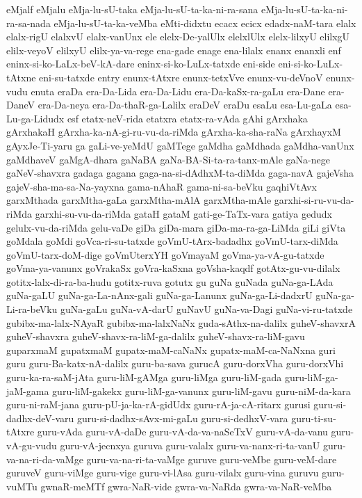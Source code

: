 {eMjalf
eMjalu
eMja-lu-sU-taka
eMja-lu-sU-ta-ka-ni-ra-sana
eMja-lu-sU-ta-ka-ni-ra-sa-nada
eMja-lu-sU-ta-ka-veMba
eMti-didxtu
ecacx
ecicx
edadx-naM-tara
elalx
elalx-rigU
elalxvU
elalx-vanUnx
ele
elelx-De-yalUlx
elelxlUlx
elelx-lilxyU
elilxgU
elilx-veyoV
elilxyU
elilx-ya-va-rege
ena-gade
enage
ena-lilalx
enanx
enanxli
enf
eninx-si-ko-LaLx-beV-kA-dare
eninx-si-ko-LuLx-tatxde
eni-side
eni-si-ko-LuLx-tAtxne
eni-su-tatxde
entry
enunx-tAtxre
enunx-tetxVve
enunx-vu-deVnoV
enunx-vudu
enuta
eraDa
era-Da-Lida
era-Da-Lidu
era-Da-kaSx-ra-gaLu
era-Dane
era-DaneV
era-Da-neya
era-Da-thaR-ga-Lalilx
eraDeV
eraDu
esaLu
esa-Lu-gaLa
esa-Lu-ga-Lidudx
esf
etatx-neV-rida
etatxra
etatx-ra-vAda
gAhi
gArxhaka
gArxhakaH
gArxha-ka-nA-gi-ru-vu-da-riMda
gArxha-ka-sha-raNa
gArxhayxM
gAyxJe-Ti-yaru
ga
gaLi-ve-yeMdU
gaMTege
gaMdha
gaMdhada
gaMdha-vanUnx
gaMdhaveV
gaMgA-dhara
gaNaBA
gaNa-BA-Si-ta-ra-tanx-mAle
gaNa-nege
gaNeV-shavxra
gadaga
gagana
gaga-na-si-dAdhxM-ta-diMda
gaga-navA
gajeVsha
gajeV-sha-ma-sa-Na-yayxna
gama-nAhaR
gama-ni-sa-beVku
gaqhiVtAvx
garxMthada
garxMtha-gaLa
garxMtha-mAlA
garxMtha-mAle
garxhi-si-ru-vu-da-riMda
garxhi-su-vu-da-riMda
gataH
gataM
gati-ge-TaTx-vara
gatiya
gedudx
gelulx-vu-da-riMda
gelu-vaDe
giDa
giDa-mara
giDa-ma-ra-ga-LiMda
giLi
giVta
goMdala
goMdi
goVca-ri-su-tatxde
goVmU-tArx-badadhx
goVmU-tarx-diMda
goVmU-tarx-doM-dige
goVmUterxYH
goVmayaM
goVma-ya-vA-gu-tatxde
goVma-ya-vanunx
goVrakaSx
goVra-kaSxna
goVsha-kaqdf
gotAtx-gu-vu-dilalx
gotitx-lalx-di-ra-ba-hudu
gotitx-ruva
gotutx
gu
guNa
guNada
guNa-ga-LAda
guNa-gaLU
guNa-ga-La-nAnx-gali
guNa-ga-Lanunx
guNa-ga-Li-dadxrU
guNa-ga-Li-ra-beVku
guNa-gaLu
guNa-vA-darU
guNavU
guNa-va-Dagi
guNa-vi-ru-tatxde
gubibx-ma-lalx-NAyaR
gubibx-ma-lalxNaNx
guda-sAthx-na-dalilx
guheV-shavxrA
guheV-shavxra
guheV-shavx-ra-liM-ga-dalilx
guheV-shavx-ra-liM-gavu
guparxmaM
gupatxmaM
gupatx-maM-caNaNx
gupatx-maM-ca-NaNxna
guri
guru
guru-Ba-katx-nA-dalilx
guru-ba-sava
gurucA
guru-dorxVha
guru-dorxVhi
guru-ka-ra-saM-jAta
guru-liM-gAMga
guru-liMga
guru-liM-gada
guru-liM-ga-jaM-gama
guru-liM-gakekx
guru-liM-ga-vanunx
guru-liM-gavu
guru-niM-da-kara
guru-ni-raM-jana
guru-pU-ja-ka-rA-gidUdx
guru-rA-ja-cA-ritarx
gurusi
guru-si-dadhx-deV-varu
guru-si-dadhx-sAvx-mi-gaLu
guru-si-dedhxV-vara
guru-ti-su-tAtxre
guru-vAda
guru-vA-daDe
guru-vA-da-va-naSeTxV
guru-vA-da-vanu
guru-vA-gu-vudu
guru-vA-jecnxya
guruva
guru-valalx
guru-va-nanx-ri-ta-vanU
guru-va-na-ri-da-vaMge
guru-va-na-ri-ta-vaMge
guruve
guru-veMbe
guru-veM-dare
guruveV
guru-viMge
guru-vige
guru-vi-lAsa
guru-vilalx
guru-vina
guruvu
guru-vuMTu
gwnaR-meMTf
gwra-NaR-vide
gwra-va-NaRda
gwra-va-NaR-veMba
}
